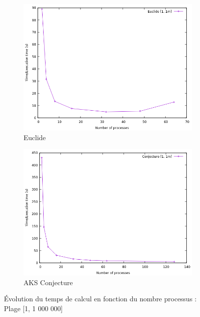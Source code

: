 \begin{figure}
        \centering
        \begin{subfigure}[b]{0.85\textwidth}
            \centering
            \includegraphics[width=\textwidth]{Euclide_1M.png}
            \caption[Network2]%
            {{\small Euclide}}    
            \label{fig:sub1}
        \end{subfigure}
        \hfill
        \begin{subfigure}[b]{0.85\textwidth}  
            \centering 
            \includegraphics[width=\textwidth]{Conjecture_1M.png}
            \caption[]%
            {{\small AKS Conjecture}}    
            \label{fig:sub2}
        \end{subfigure}
         \caption[ Évolution du temps de calcul en fonction du nombre processus]
        {\small Évolution du temps de calcul en fonction du nombre processus : Plage [1, 1 000 000]} 
        \label{fig:2}
\end{figure}
